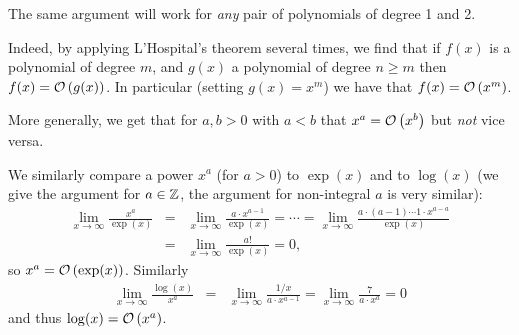 The same argument will work for {\em any} pair of polynomials of degree 1
and 2.
\smallskip

Indeed, by applying L'Hospital's theorem several times, we find that if
$f(x)$ is a polynomial of degree $m$, and $g(x)$ a polynomial of degree
$n\ge m$ then $f(x)={\mathcal O}\/\left(g(x)\right)$. In particular (setting $g(x)=x^m$) we have
that $f(x)={\mathcal O}\/\left(x^m\right)$.

More generally, we get that for $a,b>0$ with $a<b$ that $x^a={\mathcal O}\/\left(x^b\right)$ but
{\em not} vice versa.
\smallskip

We similarly compare a power $x^a$ (for $a>0$) to $\exp(x)$ and to $\log(x)$
(we give the argument for $a\in{\mathbb Z}$, the argument for non-integral $a$ is very
similar):
\begin{eqnarray*}
\lim_{x\to\infty}\frac{x^a}{\exp(x)}&=&
\lim_{x\to\infty} \frac{a\cdot x^{a-1}}{\exp(x)}=\cdots=
\lim_{x\to\infty} \frac{a\cdot(a-1)\cdots 1\cdot x^{a-a}}{\exp(x)}\\
&=&
\lim_{x\to\infty} \frac{a!}{\exp(x)}=0,
\end{eqnarray*}
so $x^a={\mathcal O}\/\left(\exp(x)\right)$. Similarly
\begin{eqnarray*}
\lim_{x\to\infty}\frac{\log(x)}{x^a}&=&
\lim_{x\to\infty}\frac{1/x}{a\cdot x^{a-1}}=
\lim_{x\to\infty}\frac{7}{a\cdot x^a}=0
\end{eqnarray*}
and thus $\log(x)={\mathcal O}\/\left(x^a\right)$.

